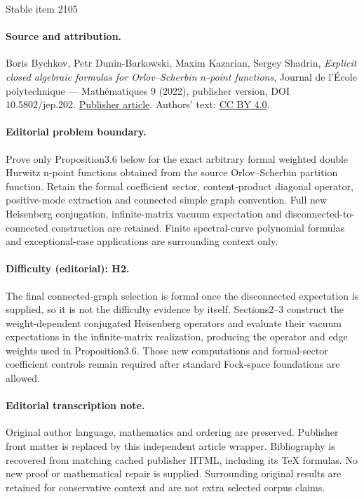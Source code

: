 \documentclass[11pt]{article}
\theoremstyle{plain}
\theoremstyle{definition}
\theoremstyle{remark}
\begin{document}
\begin{center}{\Large Stable item 2105}\end{center}
\paragraph{Source and attribution.}
Boris Bychkov, Petr Dunin-Barkowski, Maxim Kazarian, Sergey Shadrin, \emph{Explicit closed algebraic formulas for Orlov–Scherbin $n$-point functions}, Journal de l’École polytechnique — Mathématiques 9 (2022), publisher version, DOI 10.5802/jep.202. \href{https://jep.centre-mersenne.org/articles/10.5802/jep.202/}{Publisher article}. Authors' text: \href{https://creativecommons.org/licenses/by/4.0/}{CC BY 4.0}.
\paragraph{Editorial problem boundary.}
Prove only Proposition3.6 below for the exact arbitrary formal weighted double Hurwitz n-point functions obtained from the source Orlov–Scherbin partition function. Retain the formal coefficient sector, content-product diagonal operator, positive-mode extraction and connected simple graph convention. Full new Heisenberg conjugation, infinite-matrix vacuum expectation and disconnected-to-connected construction are retained. Finite spectral-curve polynomial formulas and exceptional-case applications are surrounding context only.
\paragraph{Difficulty (editorial): H2.}
The final connected-graph selection is formal once the disconnected expectation is supplied, so it is not the difficulty evidence by itself. Sections2–3 construct the weight-dependent conjugated Heisenberg operators and evaluate their vacuum expectations in the infinite-matrix realization, producing the operator and edge weights used in Proposition3.6. Those new computations and formal-sector coefficient controls remain required after standard Fock-space foundations are allowed.
\paragraph{Editorial transcription note.}
Original author language, mathematics and ordering are preserved. Publisher front matter is replaced by this independent article wrapper. Bibliography is recovered from matching cached publisher HTML, including its TeX formulas. No new proof or mathematical repair is supplied. Surrounding original results are retained for conservative context and are not extra selected corpus claims.
\clearpage
\end{document}

